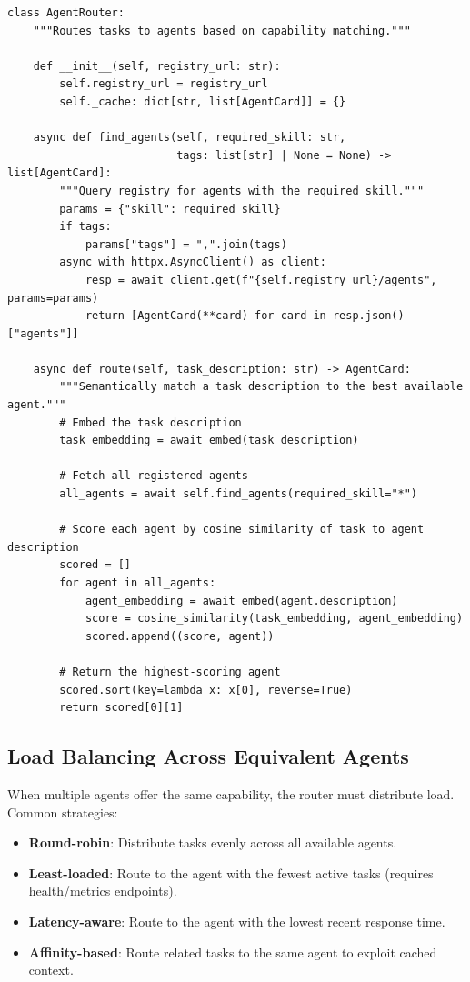 \begin{lstlisting}[style=pythonstyle]
class AgentRouter:
    """Routes tasks to agents based on capability matching."""

    def __init__(self, registry_url: str):
        self.registry_url = registry_url
        self._cache: dict[str, list[AgentCard]] = {}

    async def find_agents(self, required_skill: str,
                          tags: list[str] | None = None) -> list[AgentCard]:
        """Query registry for agents with the required skill."""
        params = {"skill": required_skill}
        if tags:
            params["tags"] = ",".join(tags)
        async with httpx.AsyncClient() as client:
            resp = await client.get(f"{self.registry_url}/agents", params=params)
            return [AgentCard(**card) for card in resp.json()["agents"]]

    async def route(self, task_description: str) -> AgentCard:
        """Semantically match a task description to the best available agent."""
        # Embed the task description
        task_embedding = await embed(task_description)

        # Fetch all registered agents
        all_agents = await self.find_agents(required_skill="*")

        # Score each agent by cosine similarity of task to agent description
        scored = []
        for agent in all_agents:
            agent_embedding = await embed(agent.description)
            score = cosine_similarity(task_embedding, agent_embedding)
            scored.append((score, agent))

        # Return the highest-scoring agent
        scored.sort(key=lambda x: x[0], reverse=True)
        return scored[0][1]
\end{lstlisting}

\subsection{Load Balancing Across Equivalent Agents}
\label{load-balancing-across-equivalent-agents}

When multiple agents offer the same capability, the router must distribute load. Common strategies:

\begin{itemize}
  \item \textbf{Round-robin}: Distribute tasks evenly across all available agents.
  \item \textbf{Least-loaded}: Route to the agent with the fewest active tasks (requires health/metrics endpoints).
  \item \textbf{Latency-aware}: Route to the agent with the lowest recent response time.
  \item \textbf{Affinity-based}: Route related tasks to the same agent to exploit cached context.
\end{itemize}

